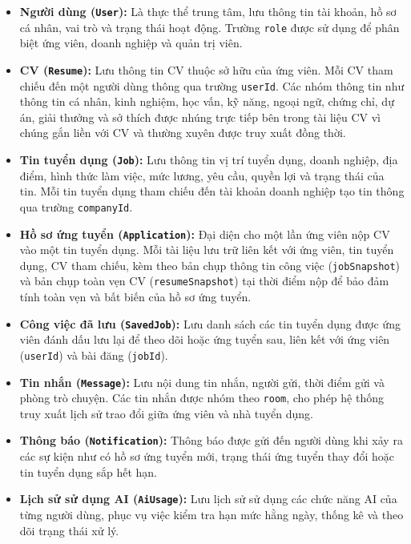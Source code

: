 \begin{itemize}
    \item \textbf{Người dùng (\texttt{User}):}
    Là thực thể trung tâm, lưu thông tin tài khoản, hồ sơ cá nhân, vai trò và trạng thái hoạt động. Trường \texttt{role} được sử dụng để phân biệt ứng viên, doanh nghiệp và quản trị viên.

    \item \textbf{CV (\texttt{Resume}):}
    Lưu thông tin CV thuộc sở hữu của ứng viên. Mỗi CV tham chiếu đến một người dùng thông qua trường \texttt{userId}. Các nhóm thông tin như thông tin cá nhân, kinh nghiệm, học vấn, kỹ năng, ngoại ngữ, chứng chỉ, dự án, giải thưởng và sở thích được nhúng trực tiếp bên trong tài liệu CV vì chúng gắn liền với CV và thường xuyên được truy xuất đồng thời.

    \item \textbf{Tin tuyển dụng (\texttt{Job}):}
    Lưu thông tin vị trí tuyển dụng, doanh nghiệp, địa điểm, hình thức làm việc, mức lương, yêu cầu, quyền lợi và trạng thái của tin. Mỗi tin tuyển dụng tham chiếu đến tài khoản doanh nghiệp tạo tin thông qua trường \texttt{companyId}.

    \item \textbf{Hồ sơ ứng tuyển (\texttt{Application}):}
    Đại diện cho một lần ứng viên nộp CV vào một tin tuyển dụng. Mỗi tài liệu lưu trữ liên kết với ứng viên, tin tuyển dụng, CV tham chiếu, kèm theo bản chụp thông tin công việc (\texttt{jobSnapshot}) và bản chụp toàn vẹn CV (\texttt{resumeSnapshot}) tại thời điểm nộp để bảo đảm tính toàn vẹn và bất biến của hồ sơ ứng tuyển.

    \item \textbf{Công việc đã lưu (\texttt{SavedJob}):}
    Lưu danh sách các tin tuyển dụng được ứng viên đánh dấu lưu lại để theo dõi hoặc ứng tuyển sau, liên kết với ứng viên (\texttt{userId}) và bài đăng (\texttt{jobId}).

    \item \textbf{Tin nhắn (\texttt{Message}):}
    Lưu nội dung tin nhắn, người gửi, thời điểm gửi và phòng trò chuyện. Các tin nhắn được nhóm theo \texttt{room}, cho phép hệ thống truy xuất lịch sử trao đổi giữa ứng viên và nhà tuyển dụng.

    \item \textbf{Thông báo (\texttt{Notification}):}
    Thông báo được gửi đến người dùng khi xảy ra các sự kiện như có hồ sơ ứng tuyển mới, trạng thái ứng tuyển thay đổi hoặc tin tuyển dụng sắp hết hạn.

    \item \textbf{Lịch sử sử dụng AI (\texttt{AiUsage}):}
    Lưu lịch sử sử dụng các chức năng AI của từng người dùng, phục vụ việc kiểm tra hạn mức hằng ngày, thống kê và theo dõi trạng thái xử lý.

\end{itemize}



